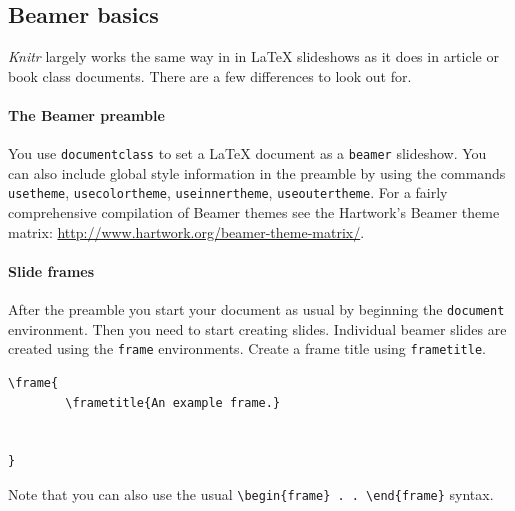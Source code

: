 \subsection{Beamer basics}

{\emph{Knitr}} largely works the same way in in LaTeX slideshows as it does in article or book class documents. There are a few differences to look out for. 

\paragraph{The Beamer preamble}

You use \texttt{documentclass} to set a LaTeX document as a \texttt{beamer} slideshow. You can also include global style information in the preamble by using the commands \texttt{usetheme}, \texttt{usecolortheme}, \texttt{useinnertheme}, \texttt{useoutertheme}. For a fairly comprehensive compilation of Beamer themes see the Hartwork's Beamer theme matrix: \url{http://www.hartwork.org/beamer-theme-matrix/}. 

\paragraph{Slide frames}

After the preamble you start your document as usual by beginning the \texttt{document} environment. Then you need to start creating slides. Individual beamer slides are created using the \texttt{frame} environments. Create a frame title using \texttt{frametitle}.

\begin{knitrout}
    \color{fgcolor}
    \begin{kframe}
        \begin{verbatim}
\frame{
        \frametitle{An example frame.}


}
        \end{verbatim}
    \end{kframe}
\end{knitrout}

\noindent Note that you can also use the usual \verb|\begin{frame} . . \end{frame}| syntax.

